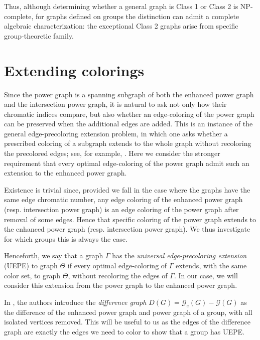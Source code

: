 \documentclass{article}
\newtheorem{theorem}{Theorem}[section]
\theoremstyle{definition}
\theoremstyle{indentclaim}
\theoremstyle{named}
\theoremstyle{named}
\begin{document}
Thus, although determining whether a general graph is Class 1 or Class 2 is NP-complete, for graphs defined on groups the distinction can admit a complete algebraic characterization: the exceptional Class 2 graphs arise from specific group-theoretic family.

\section{Extending colorings}\label{sec:uepe}


Since the power graph is a spanning subgraph of both the enhanced power graph and the
intersection power graph, it is natural to ask not only how their chromatic indices compare,
but also whether an edge-coloring of the power graph can be preserved when the additional
edges are added. This is an instance of the general edge-precoloring extension problem, in
which one asks whether a prescribed coloring of a subgraph extends to the whole graph
without recoloring the precolored edges; see, for example, \cite{GiraoKang2019}. Here we
consider the stronger requirement that every optimal edge-coloring of the power graph admit
such an extension to the enhanced power graph.


Existence is trivial since, provided we fall in the case where the graphs have the same edge chromatic number, any edge coloring of the enhanced power graph (resp. intersection power graph) is an edge coloring of the power graph after removal of some edges. Hence that specific coloring of the power graph extends to the enhanced power graph (resp. intersection power graph). We thus investigate for which groups this is always the case. 

Henceforth, we say that a graph $\Gamma$ has the \emph{universal edge-precoloring extension} (UEPE) to graph $\Theta$ if every optimal edge-coloring of $\Gamma$ extends, with the same color set, to graph $\Theta$, without recoloring the edges of $\Gamma$. In our case, we will consider this extension from the power graph to the enhanced power graph. 


In \cite{BiswasCameronDasDey2024}, the authors introduce the \textit{difference graph} $D(G) = \mathscr{G}_e(G) - \mathscr{G}(G)$ as the difference of the enhanced power graph and power graph of a group, with all isolated vertices removed. This will be useful to us as the edges of the difference graph are exactly the edges we need to color to show that a group has UEPE.  

\end{document}
